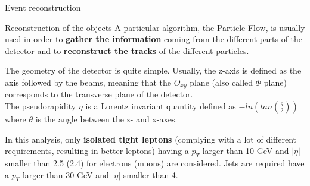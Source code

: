 \documentclass[handout,8 pt]{beamer}
\begin{document}
\begin{frame}{Event reconstruction}

	\begin{block}{\vspace{5pt} Reconstruction of the objects}
	\justifying
	\vspace{5pt}
	A particular algorithm, the Particle Flow, is usually used in order to \textbf{gather the information} coming from the different parts of the detector and to \textbf{reconstruct the tracks} of the different particles.\vspace{5pt}\vfill
	\end{block}

	\vspace{8pt}

	\begin{minipage}[c]{.54\linewidth}
	\end{minipage}
	 \begin{minipage}[c]{.44\linewidth}
   		\justifying 
		The geometry of the detector is quite simple. Usually, the z-axis is defined as the axis followed by the beams, meaning that the $O_{xy}$ plane (also called $\Phi$ plane) corresponds to the transverse plane of the detector. \\ \vspace{8pt}
		The pseudorapidity $\eta$ is a Lorentz invariant quantity defined as $-ln\left(tan(\frac{\theta}{2}) \right)$ where $\theta$ is the angle between the z- and x-axes.
		
	\end{minipage}
	
	\vspace{5pt}
	\justifying
	In this analysis, only \textbf{isolated tight leptons} (complying with a lot of different requirements, resulting in better leptons) having a $p_T$ larger than 10 GeV and $|\eta|$ smaller than 2.5 (2.4) for electrons (muons) are considered. Jets are required have a $p_T$ larger than 30 GeV and $|\eta|$ smaller than 4. \vfill

\end{frame}
\end{document}
